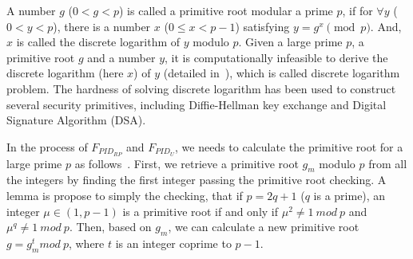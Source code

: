 A number $g$ ($0<g<p$) is called a primitive root modular a prime $p$, if for ${\forall}y$ ($0<y<p$), there is a  number $x$ ($0\le x <p-1$) satisfying $y=g^x \pmod p$.
And, $x$ is called the discrete logarithm of $y$ modulo $p$. Given a large prime $p$, a primitive root $g$ and a number $y$, it is computationally infeasible to derive the discrete logarithm (here $x$) of $y$ (detailed in~\cite{WXWM}), which is called discrete logarithm problem.
The hardness of solving discrete logarithm has been used to construct several security primitives, including Diffie-Hellman key exchange and Digital Signature Algorithm (DSA).

In the process of $F_{PID_{RP}}$ and $F_{PID_U}$, we needs to calculate the primitive root for a  large prime $p$ as follows~\cite{Shoup,Wang}.
First, we retrieve a primitive root $g_m$  modulo $p$ from all the integers by finding the first integer passing  the primitive root checking.
 A lemma is propose to simply the checking, that if $p=2q+1$ ($q$ is a prime),  an integer $\mu \in (1, p-1)$ is a primitive root if and only if $\mu^2\neq 1 \ mod \ p$ and $\mu^q\neq 1 \ mod \ p$.
Then, based on $g_m$, we can calculate a new primitive root $g = g_{m}^{t} mod \ p$, where $t$ is an integer coprime to $p-1$.
 



